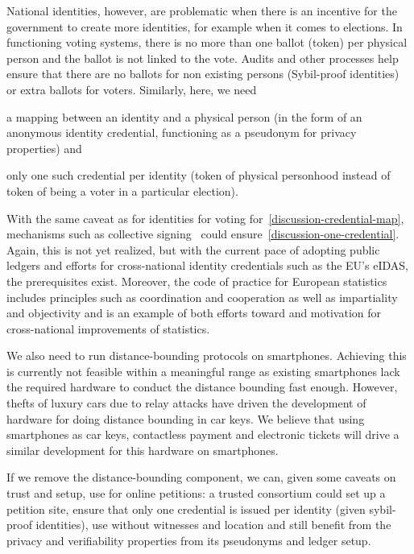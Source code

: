 National identities, however, are problematic when there is an
incentive for the government to create more identities, for example
when it comes to elections.  In functioning voting systems, there is
no more than one ballot (token) per physical person and the ballot is
not linked to the vote. Audits and other processes help ensure that
there are no ballots for non existing persons (Sybil-proof identities)
or extra ballots for voters. Similarly, here, we need
\begin{enumerate*}
\item\label{discussion-credential-map} a mapping between an identity and a 
  physical person (in the form of an anonymous identity credential, functioning 
  as a pseudonym for privacy
properties) and
\item\label{discussion-one-credential} only one such credential per identity 
  (token of physical personhood instead of token of being a voter in a 
  particular election).
\end{enumerate*}
With the same caveat as for identities for voting 
for~\ref{discussion-credential-map}, mechanisms such as collective 
signing~\cite{collective-signing} could ensure~\ref{discussion-one-credential}.
Again, this is not yet realized, but with the current pace
of adopting public ledgers and efforts for cross-national identity
credentials such as the EU's eIDAS, the prerequisites exist. Moreover,
the code of practice for European statistics~\cite{EuroStat} includes 
principles such as coordination and cooperation as well as
impartiality and objectivity and is an example of both efforts toward
and motivation for cross-national improvements of statistics.


We also need to run distance-bounding protocols on smartphones.
Achieving this is currently not feasible within a meaningful range as
existing smartphones lack the required hardware to conduct the
distance bounding fast enough.  However, thefts of luxury cars due to
relay attacks have driven the development of hardware for doing
distance bounding in car keys.  We believe that using smartphones as car keys, 
contactless payment and electronic tickets will drive a similar
development for this hardware on smartphones.

If we remove the distance-bounding component, we can, given some
caveats on trust and setup, use \CROCUS for online petitions: a
trusted consortium could set up a petition site, ensure that only one
credential is issued per identity (given sybil-proof identities), use \CROCUS 
without
witnesses and location and still benefit from the privacy and
verifiability properties from its pseudonyms and ledger setup.


